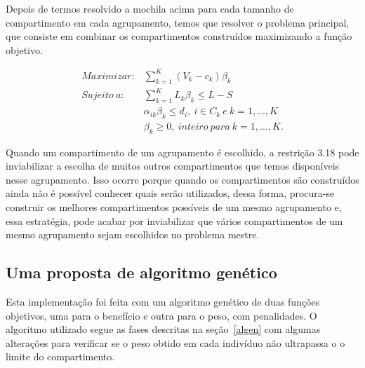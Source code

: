 Depois de termos resolvido a mochila acima para cada tamanho de compartimento em cada agrupamento, temos que resolver o problema principal, que consiste em combinar os compartimentos construídos maximizando a função objetivo.

\begin{eqnarray}
	Maximizar: & \displaystyle \sum_{k = 1}^{K}(V_{k} - c_{k})\beta_{k} \\
	Sujeito \ a: & \displaystyle \sum_{k = 1}^{K}L_{k}\beta_{k} \leq L - S \\
	& \displaystyle \alpha_{ik}\beta_{k} \leq d_{i}, \ i \in C_{k} \ e \ k = 1, ..., K \nonumber \\
	& \beta_{k} \geq 0, \ inteiro \ para \ k  = 1, ..., K. \nonumber
\end{eqnarray}

Quando um compartimento de um agrupamento é escolhido, a restrição 3.18 pode inviabilizar a escolha de muitos outros compartimentos que temos disponíveis nesse agrupamento. Isso ocorre porque quando os compartimentos são construídos ainda não é possível conhecer quais serão utilizados, dessa forma, procura-se construir os melhores compartimentos possíveis de um mesmo agrupamento e, essa estratégia, pode acabar por inviabilizar que vários compartimentos de um mesmo agrupamento sejam escolhidos no problema mestre.

% 
% 
% 
% 

\subsection{Uma proposta de algoritmo genético}

Esta implementação foi feita com um algoritmo genético de duas funções objetivos, uma para o benefício e outra para o peso, com penalidades. O algoritmo utilizado segue as fases descritas na seção~\ref{algen} com algumas alterações para verificar se o peso obtido em cada indivíduo não ultrapassa o o limite do compartimento.

